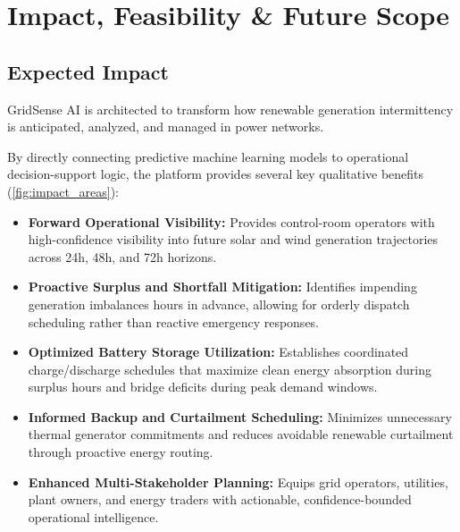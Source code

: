 \section{Impact, Feasibility \& Future Scope}
\label{sec:impact_feasibility_future}

\subsection{Expected Impact}
\label{subsec:expected_impact}

GridSense AI is architected to transform how renewable generation intermittency is anticipated, analyzed, and managed in power networks.

By directly connecting predictive machine learning models to operational decision-support logic, the platform provides several key qualitative benefits (\cref{fig:impact_areas}):
\begin{itemize}[leftmargin=1.8em, itemsep=0.25em]
    \item \textbf{Forward Operational Visibility:} Provides control-room operators with high-confidence visibility into future solar and wind generation trajectories across 24h, 48h, and 72h horizons.
    \item \textbf{Proactive Surplus and Shortfall Mitigation:} Identifies impending generation imbalances hours in advance, allowing for orderly dispatch scheduling rather than reactive emergency responses.
    \item \textbf{Optimized Battery Storage Utilization:} Establishes coordinated charge/discharge schedules that maximize clean energy absorption during surplus hours and bridge deficits during peak demand windows.
    \item \textbf{Informed Backup and Curtailment Scheduling:} Minimizes unnecessary thermal generator commitments and reduces avoidable renewable curtailment through proactive energy routing.
    \item \textbf{Enhanced Multi-Stakeholder Planning:} Equips grid operators, utilities, plant owners, and energy traders with actionable, confidence-bounded operational intelligence.
\end{itemize}

